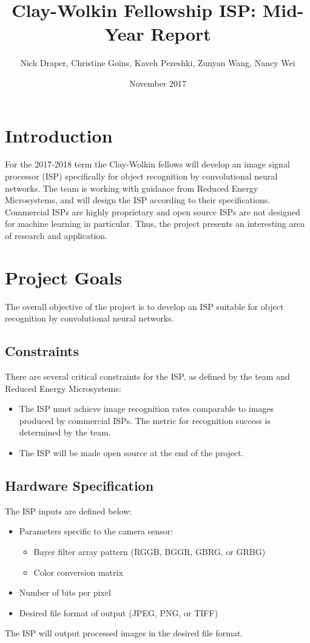 \documentclass{report}
\begin{document}
	
\title{Clay-Wolkin Fellowship ISP: Mid-Year Report}
\author{Nick Draper, Christine Goins, Kaveh Pezeshki, Zunyan Wang, Nancy Wei}
\date{November 2017}
\maketitle

\tableofcontents

\begin{abstract}
	\label{abstract}
\end{abstract}

\chapter{Introduction}
	For the 2017-2018 term the Clay-Wolkin fellows will develop an image signal processor (ISP) specifically for object recognition by convolutional neural networks. The team is working with guidance from Reduced Energy Microsystems, and will design the ISP according to their specifications. Commercial ISPs are highly proprietary and open source ISPs are not designed for machine learning in particular. Thus, the project presents an interesting area of research and application. 
\chapter{Project Goals}
	The overall objective of the project is to develop an ISP suitable for object recognition by convolutional neural networks.
	\section{Constraints}
	There are several critical constraints for the ISP, as defined by the team and Reduced Energy Microsystems:
	\begin{itemize}
		\item The ISP must achieve image recognition rates comparable to images produced by commercial ISPs. The metric for recognition success is determined by the team. 
		\item The ISP will be made open source at the end of the project.
	\end{itemize}
	\section{Hardware Specification}
	The ISP inputs are defined below:
	\begin{itemize}
		\item Parameters specific to the camera sensor:
		\begin{itemize}
			\item Bayer filter array pattern (RGGB, BGGR, GBRG, or GRBG)
			\item Color conversion matrix 
		\end{itemize}
		\item Number of bits per pixel
		\item Desired file format of output (JPEG, PNG, or TIFF)
	\end{itemize}
	The ISP will output processed images in the desired file format. 
	
\end{document}
